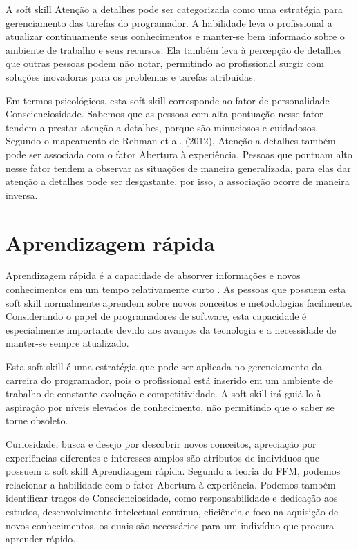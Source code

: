 A soft skill Atenção a detalhes pode ser categorizada como uma estratégia para gerenciamento das tarefas do programador. A habilidade leva o profissional a atualizar continuamente seus conhecimentos e manter-se bem informado sobre o ambiente de trabalho e seus recursos. Ela também leva à percepção de detalhes que outras pessoas podem não notar, permitindo ao profissional surgir com soluções inovadoras para os problemas e tarefas atribuídas.

Em termos psicológicos, esta soft skill corresponde ao fator de personalidade Conscienciosidade. Sabemos que as pessoas com alta pontuação nesse fator tendem a prestar atenção a detalhes, porque são minuciosos e cuidadosos.
Segundo o mapeamento de Rehman et al. (2012)\nocite{rehman:12}, Atenção a detalhes também pode ser associada com o fator Abertura à experiência. Pessoas que pontuam alto nesse fator tendem a observar as situações de maneira generalizada, para elas dar atenção a detalhes pode ser desgastante, por isso, a associação ocorre de maneira inversa.


\section{Aprendizagem rápida}

Aprendizagem rápida é a capacidade de absorver informações e novos conhecimentos em um tempo relativamente curto \cite{ahmed:12}. As pessoas que possuem esta soft skill normalmente aprendem sobre novos conceitos e metodologias facilmente. Considerando o papel de programadores de software, esta capacidade é especialmente importante devido aos avanços da tecnologia e a necessidade de manter-se sempre atualizado.

Esta soft skill é uma estratégia que pode ser aplicada no gerenciamento da carreira do programador, pois o profissional está inserido em um ambiente de trabalho de constante evolução e competitividade. A soft skill irá guiá-lo à aspiração por níveis elevados de conhecimento, não permitindo que o saber se torne obsoleto. 

Curiosidade, busca e desejo por descobrir novos conceitos, apreciação por experiências diferentes e interesses amplos são atributos de indivíduos que possuem a soft skill Aprendizagem rápida. Segundo a teoria do FFM, podemos relacionar a habilidade com o fator Abertura à experiência.
Podemos também identificar traços de Conscienciosidade, como responsabilidade e dedicação aos estudos, desenvolvimento intelectual contínuo, eficiência e foco na aquisição de novos conhecimentos, os quais são necessários para um indivíduo que procura aprender rápido.

